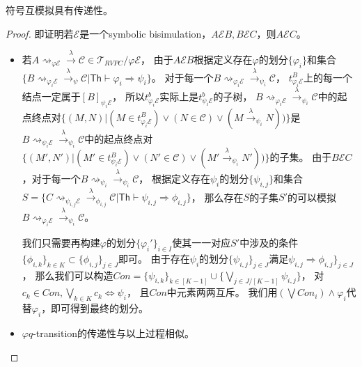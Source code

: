 \begin{lemma}
   符号互模拟具有传递性。
\end{lemma} 
\begin{proof}
   即证明若$\mathcal{E}$是一个symbolic bisimulation，$A\mathcal{E}B, B \mathcal{E} C$，则$A \mathcal{E} C$。
   \begin{itemize}
      \item {
         若$A\rightsquigarrow_{\varphi \mathcal{E}}\stackrel{\lambda}{\rightarrow} \mathcal{C}\in \mathcal{T}_{RVPC}/\varphi\mathcal{E}$，
         由于$A\mathcal{E}B$根据定义存在$\varphi$的划分$\{\varphi_i\}$和集合$\{B\rightsquigarrow_{\varphi_i\mathcal{E}}\stackrel{\lambda}{\rightarrow}_{\psi}\mathcal{C}|\mathsf{Th}\vdash \varphi_i\Rightarrow\psi_i\}$。
         对于每一个$B\rightsquigarrow_{\varphi_i\mathcal{E}}\stackrel{\lambda}{\rightarrow}_{\psi_i}\mathcal{C}$，
         $t^B_{\varphi_i\mathcal{E}}$上的每一个结点一定属于$[B]_{\psi_i\mathcal{E}}$，
         所以$t^b_{\varphi_i\mathcal{E}}$实际上是$t^b_{\psi_i\mathcal{E}}$的子树，
         $B\rightsquigarrow_{\varphi_i\mathcal{E}}\stackrel{\lambda}{\rightarrow}_{\psi_i}\mathcal{C}$中的起点终点对$\{(M,N)|(M\in t^B_{\varphi_i\mathcal{E}})\vee(N\in \mathcal{C}) \vee (M\stackrel{\lambda}{\rightarrow}_{\psi_i}N))\}$是
         $B\rightsquigarrow_{\psi_i\mathcal{E}}\stackrel{\lambda}{\rightarrow}_{\psi_i}\mathcal{C}$中的起点终点对$\{(M',N')|(M'\in t^B_{\psi_i\mathcal{E}})\vee(N'\in \mathcal{C}) \vee (M'\stackrel{\lambda}{\rightarrow}_{\psi_i}N'))\}$的子集。
         由于$B\mathcal{E}C$，对于每一个$B\rightsquigarrow_{\psi_i}\stackrel{\lambda}{\rightarrow}_{\psi_i}\mathcal{C}$，
         根据定义存在$\psi_i$的划分$\{\psi_{i,j}\}$和集合$S=\{C\rightsquigarrow_{\psi_{i,j}\mathcal{E}}\stackrel{\lambda}{\rightarrow}_{\phi_{i,j}}\mathcal{C}|\mathsf{Th}\vdash \psi_{i,j}\Rightarrow \phi_{i,j}\}$，
         那么存在$S$的子集$S'$的可以模拟$B\rightsquigarrow_{\varphi_i\mathcal{E}}\stackrel{\lambda}{\rightarrow}_{\psi_i}\mathcal{C}$。
   
         我们只需要再构建$\varphi$的划分$\{\varphi_i'\}_{i\in I}$使其一一对应$S'$中涉及的条件$\{\phi_{i,k}\}_{k\in K}\subset\{\phi_{i,j}\}_{j\in J}$即可。
         由于存在$\psi_i$的划分$\{\psi_{i,j}\}_{j\in J}$满足$\psi_{i,j}\Rightarrow \phi_{i,j}\}_{j\in J}$，
         那么我们可以构造$Con=\{\psi_{i,k}\}_{k\in [K-1]}\cup\{\bigvee_{j\in J/[K-1]}\psi_{i,j}\}$，
         对$c_k\in Con, \bigvee_{k\in K}c_k \Leftrightarrow \psi_i$， 且$Con$中元素两两互斥。
         我们用$(\bigvee Con_i)\wedge \varphi_i$代替$\varphi_i$，即可得到最终的划分。
      }
      \item {
         $\varphi q$-transition的传递性与以上过程相似。
      }
   \end{itemize}
\end{proof}
